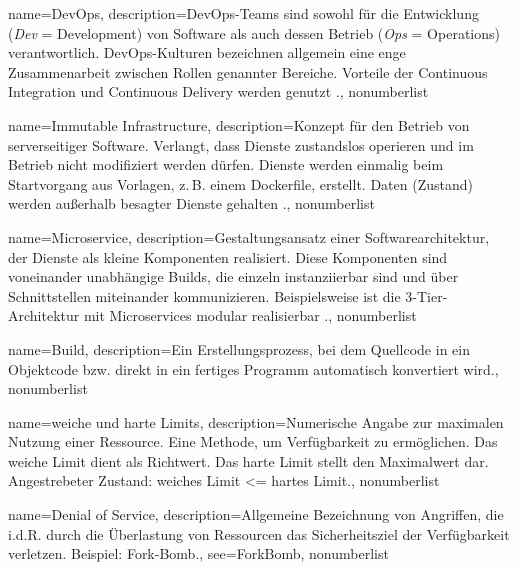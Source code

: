 {%
  name={DevOps},
  description={DevOps-Teams sind sowohl für die Entwicklung (\emph{Dev} = Development) von Software als auch dessen Betrieb (\emph{Ops} = Operations) verantwortlich. DevOps-Kulturen bezeichnen allgemein eine enge Zusammenarbeit zwischen Rollen genannter Bereiche. Vorteile der Continuous Integration und Continuous Delivery werden genutzt \cite{devops}.},
  nonumberlist
}

{%
  name={Immutable Infrastructure},
  description={Konzept für den Betrieb von serverseitiger Software. Verlangt, dass Dienste zustandslos operieren und im Betrieb nicht modifiziert werden dürfen. Dienste werden einmalig beim Startvorgang aus Vorlagen, z.\,B. einem Dockerfile, erstellt. Daten (Zustand) werden außerhalb besagter Dienste gehalten \cite{unikernelMeetsDocker}\cite{immutableInfrastructure}.},
  nonumberlist
}

{%
  name={Microservice},
  description={Gestaltungsansatz einer Softwarearchitektur, der Dienste als kleine Komponenten realisiert. Diese Komponenten sind voneinander unabhängige Builds, die einzeln instanziierbar sind und über Schnittstellen miteinander kommunizieren. Beispielsweise ist die 3-Tier-Architektur mit Microservices modular realisierbar \cite{microservices}.},
  nonumberlist
}

{%
  name={Build},
  description={Ein Erstellungsprozess, bei dem Quellcode in ein Objektcode bzw. direkt in ein fertiges Programm automatisch konvertiert wird.},
  nonumberlist
}

{%
  name={weiche und harte Limits},
  description={Numerische Angabe zur maximalen Nutzung einer Ressource. Eine Methode, um Verfügbarkeit zu ermöglichen. Das weiche Limit dient als Richtwert. Das harte Limit stellt den Maximalwert dar. Angestrebeter Zustand: weiches Limit \textless= hartes Limit.},
  nonumberlist
}

{%
  name={Denial of Service},
  description={Allgemeine Bezeichnung von Angriffen, die i.d.R. durch die Überlastung von Ressourcen das Sicherheitsziel der Verfügbarkeit verletzen. Beispiel: Fork-Bomb.},
  see={ForkBomb},
  nonumberlist
}

